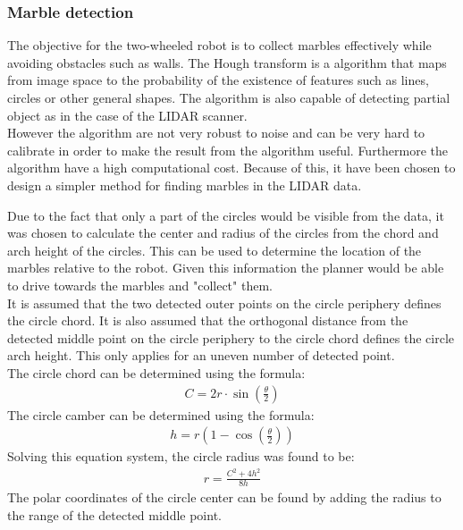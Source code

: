 \documentclass[../Head/Main.tex]{subfiles}
\begin{document}
\subsubsection{Marble detection}
\label{subsec:DesignMarbleDetection}
The objective for the two-wheeled robot is to collect marbles effectively while avoiding obstacles such as walls. 
The Hough transform is a algorithm that maps from image space to the probability of the existence of features such as lines, circles or other general shapes. The algorithm is also capable of detecting partial object as in the case of the LIDAR scanner. \\
However the algorithm are not very robust to noise and can be very hard to calibrate in order to make the result from the algorithm useful. Furthermore the algorithm have a high computational cost. Because of this, it have been chosen to design a simpler method for finding marbles in the LIDAR data. \par  
Due to the fact that only a part of the circles would be visible from the data, it was chosen to calculate the center and radius of the circles from the chord and arch height of the circles. This can be used to determine the location of the marbles relative to the robot. Given this information the planner would be able to drive towards the marbles and "collect" them. \\
It is assumed that the two detected outer points on the circle periphery defines the circle chord. It is also assumed that the orthogonal distance from the detected middle point on the circle periphery to the circle chord defines the circle arch height. This only applies for an uneven number of detected point.\\
The circle chord can be determined using the formula:
\begin{align*}
	C = 2r\cdot\sin\left(\frac{\theta}{2}\right)
\end{align*}
The circle camber can be determined using the formula:
\begin{align*}
	h = r\left(1-\cos\left(\frac{\theta}{2}\right)\right)
\end{align*}
Solving this equation system, the circle radius was found to be:
\begin{align*}
	r = \frac{C^2+4h^2}{8h}
\end{align*}
The polar coordinates of the circle center can be found by adding the radius to the range of the detected middle point.

\end{document}
